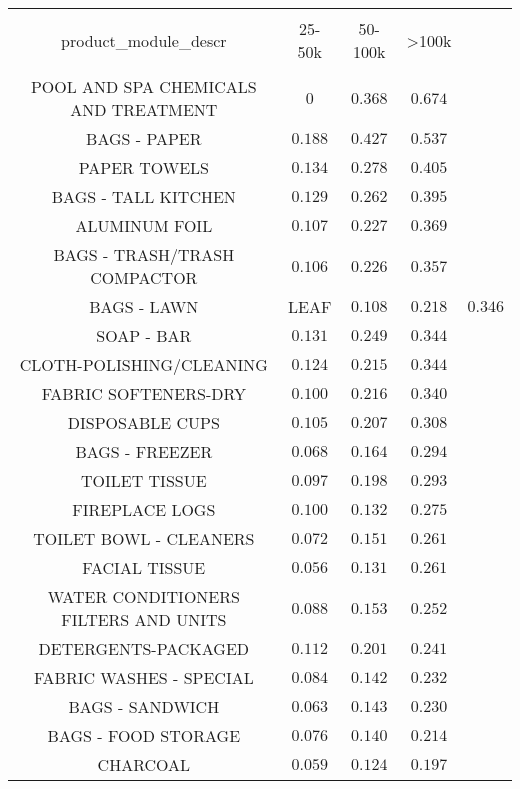 
\begin{table}[!htbp] \centering 
  \caption{} 
  \label{} 
\begin{tabular}{@{\extracolsep{5pt}} cccc} 
\\[-1.8ex]\hline 
\hline \\[-1.8ex] 
product\_module\_descr & 25-50k & 50-100k & \textgreater 100k \\ 
\hline \\[-1.8ex] 
POOL AND SPA CHEMICALS AND TREATMENT & $0$ & $0.368$ & $0.674$ \\ 
BAGS - PAPER & $0.188$ & $0.427$ & $0.537$ \\ 
PAPER TOWELS & $0.134$ & $0.278$ & $0.405$ \\ 
BAGS - TALL KITCHEN & $0.129$ & $0.262$ & $0.395$ \\ 
ALUMINUM FOIL & $0.107$ & $0.227$ & $0.369$ \\ 
BAGS - TRASH/TRASH COMPACTOR & $0.106$ & $0.226$ & $0.357$ \\ 
BAGS - LAWN & LEAF & $0.108$ & $0.218$ & $0.346$ \\ 
SOAP - BAR & $0.131$ & $0.249$ & $0.344$ \\ 
CLOTH-POLISHING/CLEANING & $0.124$ & $0.215$ & $0.344$ \\ 
FABRIC SOFTENERS-DRY & $0.100$ & $0.216$ & $0.340$ \\ 
DISPOSABLE CUPS & $0.105$ & $0.207$ & $0.308$ \\ 
BAGS - FREEZER & $0.068$ & $0.164$ & $0.294$ \\ 
TOILET TISSUE & $0.097$ & $0.198$ & $0.293$ \\ 
FIREPLACE LOGS & $0.100$ & $0.132$ & $0.275$ \\ 
TOILET BOWL - CLEANERS & $0.072$ & $0.151$ & $0.261$ \\ 
FACIAL TISSUE & $0.056$ & $0.131$ & $0.261$ \\ 
WATER CONDITIONERS FILTERS AND UNITS & $0.088$ & $0.153$ & $0.252$ \\ 
DETERGENTS-PACKAGED & $0.112$ & $0.201$ & $0.241$ \\ 
FABRIC WASHES - SPECIAL & $0.084$ & $0.142$ & $0.232$ \\ 
BAGS - SANDWICH & $0.063$ & $0.143$ & $0.230$ \\ 
BAGS - FOOD STORAGE & $0.076$ & $0.140$ & $0.214$ \\ 
CHARCOAL & $0.059$ & $0.124$ & $0.197$ \\ 

\end{tabular}
\end{table}
